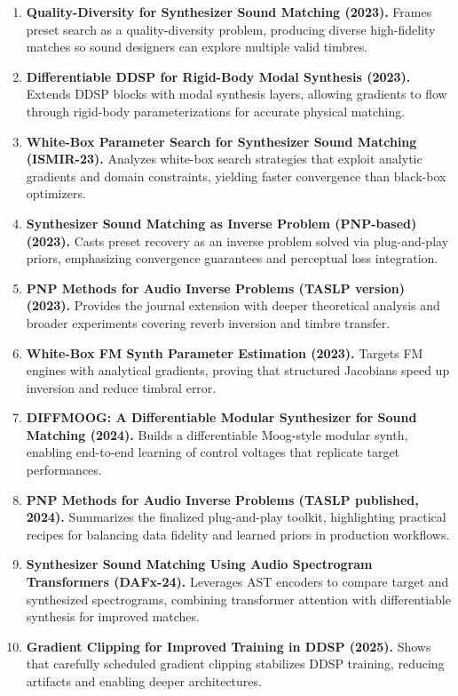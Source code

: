 \documentclass[12pt]{article}
\begin{document}
\begin{enumerate}[leftmargin=*]
    \item \textbf{Quality-Diversity for Synthesizer Sound Matching (2023).} Frames preset search as a quality-diversity problem, producing diverse high-fidelity matches so sound designers can explore multiple valid timbres.
    \item \textbf{Differentiable DDSP for Rigid-Body Modal Synthesis (2023).} Extends DDSP blocks with modal synthesis layers, allowing gradients to flow through rigid-body parameterizations for accurate physical matching.
    \item \textbf{White-Box Parameter Search for Synthesizer Sound Matching (ISMIR-23).} Analyzes white-box search strategies that exploit analytic gradients and domain constraints, yielding faster convergence than black-box optimizers.
    \item \textbf{Synthesizer Sound Matching as Inverse Problem (PNP-based) (2023).} Casts preset recovery as an inverse problem solved via plug-and-play priors, emphasizing convergence guarantees and perceptual loss integration.
    \item \textbf{PNP Methods for Audio Inverse Problems (TASLP version) (2023).} Provides the journal extension with deeper theoretical analysis and broader experiments covering reverb inversion and timbre transfer.
    \item \textbf{White-Box FM Synth Parameter Estimation (2023).} Targets FM engines with analytical gradients, proving that structured Jacobians speed up inversion and reduce timbral error.
    \item \textbf{DIFFMOOG: A Differentiable Modular Synthesizer for Sound Matching (2024).} Builds a differentiable Moog-style modular synth, enabling end-to-end learning of control voltages that replicate target performances.
    \item \textbf{PNP Methods for Audio Inverse Problems (TASLP published, 2024).} Summarizes the finalized plug-and-play toolkit, highlighting practical recipes for balancing data fidelity and learned priors in production workflows.
    \item \textbf{Synthesizer Sound Matching Using Audio Spectrogram Transformers (DAFx-24).} Leverages AST encoders to compare target and synthesized spectrograms, combining transformer attention with differentiable synthesis for improved matches.
    \item \textbf{Gradient Clipping for Improved Training in DDSP (2025).} Shows that carefully scheduled gradient clipping stabilizes DDSP training, reducing artifacts and enabling deeper architectures.

\end{enumerate}
\end{document}
